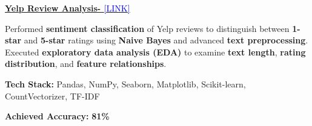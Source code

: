 \begin{onecolentry}
\textbf{\underline{Yelp Review Analysis- }}\href{https://github.com/SkJishan04/NLP-Project}{\textcolor{blue}{[LINK]}}
\end{onecolentry}
\begin{onecolentry}
    \begin{highlights}
        \item Performed \textbf{sentiment classification} of Yelp reviews to distinguish between \textbf{1-star} and \textbf{5-star} ratings using \textbf{Naive Bayes} and advanced \textbf{text preprocessing}.
         Executed \textbf{exploratory data analysis (EDA)} to examine \textbf{text length}, \textbf{rating distribution}, and \textbf{feature relationships}.
        \item \textbf{Tech Stack:} Pandas, NumPy, Seaborn, Matplotlib, Scikit-learn, CountVectorizer, TF-IDF
        \item \textbf{Achieved Accuracy:} \textbf{81\%}
    \end{highlights}
\end{onecolentry}
